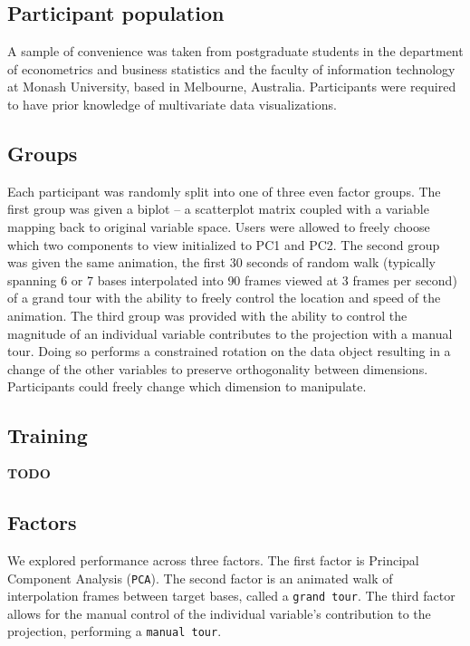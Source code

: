 \documentclass[]{article}
\begin{document}
\hypertarget{sec:population}{%
\subsection{Participant population}\label{sec:population}}

A sample of convenience was taken from postgraduate students in the
department of econometrics and business statistics and the faculty of
information technology at Monash University, based in Melbourne,
Australia. Participants were required to have prior knowledge of
multivariate data visualizations.

\hypertarget{sec:groups}{%
\subsection{Groups}\label{sec:groups}}

Each participant was randomly split into one of three even factor
groups. The first group was given a biplot -- a scatterplot matrix
coupled with a variable mapping back to original variable space. Users
were allowed to freely choose which two components to view initialized
to PC1 and PC2. The second group was given the same animation, the first
30 seconds of random walk (typically spanning 6 or 7 bases interpolated
into 90 frames viewed at 3 frames per second) of a grand tour with the
ability to freely control the location and speed of the animation. The
third group was provided with the ability to control the magnitude of an
individual variable contributes to the projection with a manual tour.
Doing so performs a constrained rotation on the data object resulting in
a change of the other variables to preserve orthogonality between
dimensions. Participants could freely change which dimension to
manipulate.

\hypertarget{sec:training}{%
\subsection{Training}\label{sec:training}}

\textbf{TODO}

\hypertarget{sec:factors}{%
\subsection{Factors}\label{sec:factors}}

We explored performance across three factors. The first factor is
Principal Component Analysis (\texttt{PCA}). The second factor is an
animated walk of interpolation frames between target bases, called a
\texttt{grand\ tour}. The third factor allows for the manual control of
the individual variable's contribution to the projection, performing a
\texttt{manual\ tour}.
\end{document}
